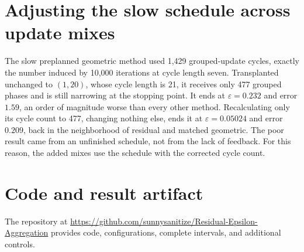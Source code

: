 \documentclass{article}
\begin{document}
\section{Adjusting the slow schedule across update mixes}
\label{app:slow}

The slow preplanned geometric method used 1,429 grouped-update cycles, exactly the
number induced by 10,000 iterations at cycle length seven.  Transplanted
unchanged to $(1,20)$, whose cycle length is 21, it receives only 477 grouped
phases and is still narrowing at the stopping point.  It ends at
$\varepsilon=0.232$ and
error $1.59$, an order of magnitude worse than every other method.  Recalculating
only its cycle count to 477, changing nothing else, ends it at
$\varepsilon=0.05024$ and error $0.209$, back in the neighborhood of residual
and matched geometric.  The poor result came from an unfinished schedule, not
from the lack of feedback.  For this reason, the added mixes use the schedule
with the corrected cycle count.

\section{Code and result artifact}
\label{app:artifact}

The repository at
\url{https://github.com/sunnysanitize/Residual-Epsilon-Aggregation} provides
code, configurations, complete intervals, and additional controls.
\end{document}
